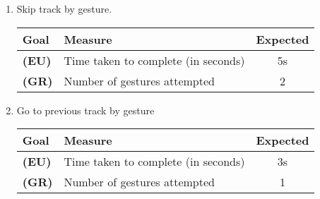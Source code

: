 \documentclass[12pt,letterpaper]{article}
\begin{document}
\begin{enumerate}
\item Skip track by gesture.
\begin{center}\begin{tabular}{l|l|c}
\textbf{Goal} & \textbf{Measure} & \textbf{Expected} \\
\hline
\textbf{(EU)} & Time taken to complete (in seconds) & 5s \\
\hline
\textbf{(GR)} & Number of gestures attempted & 2 \\
\hline
\end{tabular}\end{center}

\item Go to previous track by gesture
\begin{center}\begin{tabular}{l|l|c}
\textbf{Goal} & \textbf{Measure} & \textbf{Expected} \\
\hline
\textbf{(EU)} & Time taken to complete (in seconds) & 3s \\
\hline
\textbf{(GR)} & Number of gestures attempted & 1 \\
\hline
\end{tabular}\end{center}




\end{enumerate}
\end{document}
